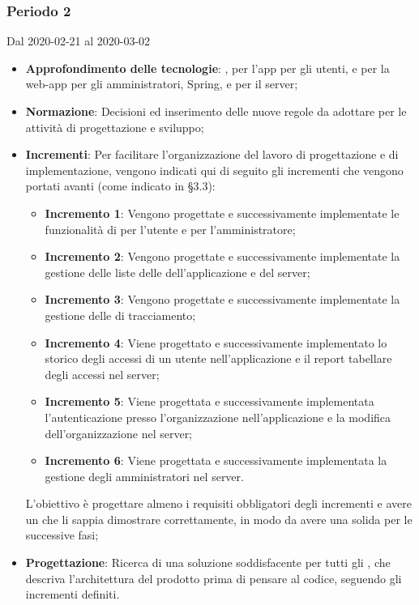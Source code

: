\subsubsection{Periodo 2} 
Dal 2020-02-21 al 2020-03-02
\begin{itemize}
	\item \textbf{Approfondimento delle tecnologie}: ,  per l'app per gli utenti,  e  per la web-app per gli amministratori, Spring,  e  per il server;
	\item \textbf{Normazione}: Decisioni ed inserimento delle nuove regole da adottare per le attività di progettazione e sviluppo;
	\item \textbf{Incrementi}: Per facilitare l'organizzazione del lavoro di progettazione e di implementazione, vengono indicati qui di seguito gli incrementi che vengono portati avanti (come indicato in §3.3):
		\begin{itemize}
			\item \textbf{Incremento 1}: Vengono progettate e successivamente implementate le funzionalità di  per l'utente e per l'amministratore;
			\item \textbf{Incremento 2}: Vengono progettate e successivamente implementate la gestione delle liste delle  dell'applicazione e del server;
			\item \textbf{Incremento 3}: Vengono progettate e successivamente implementate la gestione delle  di tracciamento;
			\item \textbf{Incremento 4}: Viene progettato e successivamente implementato lo storico degli accessi di un utente nell'applicazione e il report tabellare degli accessi nel server;
			\item \textbf{Incremento 5}: Viene progettata e successivamente implementata l'autenticazione presso l'organizzazione nell'applicazione e la modifica dell'organizzazione nel server;
			\item \textbf{Incremento 6}: Viene progettata e successivamente implementata la gestione degli amministratori nel server.
		\end{itemize}
		L'obiettivo è progettare almeno i requisiti obbligatori degli incrementi e avere un  che li sappia dimostrare correttamente, in modo da avere una solida  per le successive fasi;
	\item \textbf{Progettazione}: Ricerca di una soluzione soddisfacente per tutti gli , che descriva l'architettura del prodotto prima di pensare al codice, seguendo gli incrementi definiti.

\end{itemize}
